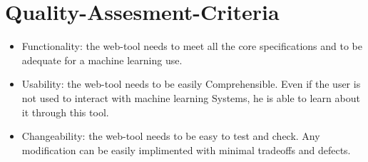 \section{Quality-Assesment-Criteria }
%
\newpage

\begin{itemize}
  \item  Functionality: the web-tool needs to meet all the core specifications and to be adequate for a machine learning use.
  \item  Usability: the web-tool needs to be easily Comprehensible. Even if the user is not used to interact with machine learning Systems, he is able to learn about it through this tool.
 \item   Changeability: the web-tool needs to be easy to test and check. Any modification can be easily implimented with minimal tradeoffs and defects.
\end{itemize}



   
    